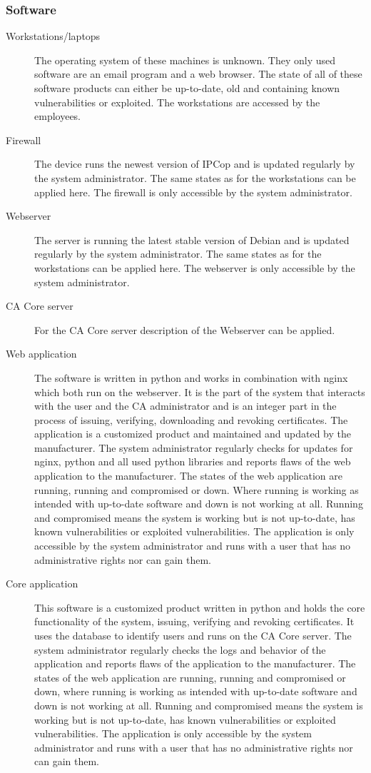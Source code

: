 \documentclass[a4paper, toc=index, 12pt, DIV14, twoside, BCOR2cm, headsepline, numbers=noenddot, bibliography=totoc]{scrbook}
\begin{document}
\subsubsection{Software}
\begin{description}
\item[Workstations/laptops ] The operating system of these machines is unknown. They only used software are an email program and a web browser. The state of all of these software products can either be up-to-date, old and containing known vulnerabilities or exploited. The workstations are accessed by the employees.
\item[Firewall ] The device runs the newest version of IPCop and is updated regularly by the system administrator. The same states as for the workstations can be applied here. The firewall is only accessible by the system administrator.
\item[Webserver ] The server is running the latest stable version of Debian and is updated regularly by the system administrator. The same states as for the workstations can be applied here. The webserver is only accessible by the system administrator.
\item[CA Core server ] For the CA Core server description of the Webserver can be applied.
\item[Web application ] The software is written in python and works in combination with nginx which both run on the webserver. It is the part of the system that interacts with the user and the CA administrator and is an integer part in the process of issuing, verifying, downloading and revoking certificates. The application is a customized product and maintained and updated by the manufacturer. The system administrator regularly checks for updates for nginx, python and all used python libraries and reports flaws of the web application to the manufacturer. The states of the web application are running, running and compromised or down. Where running is working as intended with up-to-date software and down is not working at all. Running and compromised means the system is working but is not up-to-date, has known vulnerabilities or exploited vulnerabilities. The application is only accessible by the system administrator and runs with a user that has no administrative rights nor can gain them.
\item[Core application ] This software is a customized product written in python and holds the core functionality of the system, issuing, verifying and revoking certificates. It uses the database to identify users and runs on the CA Core server. The system administrator regularly checks the logs and behavior of the application and reports flaws of the application to the manufacturer. The states of the web application are running, running and compromised or down, where running is working as intended with up-to-date software and down is not working at all. Running and compromised means the system is working but is not up-to-date, has known vulnerabilities or exploited vulnerabilities. The application is only accessible by the system administrator and runs with a user that has no administrative rights nor can gain them.

\end{description}
\end{document}
